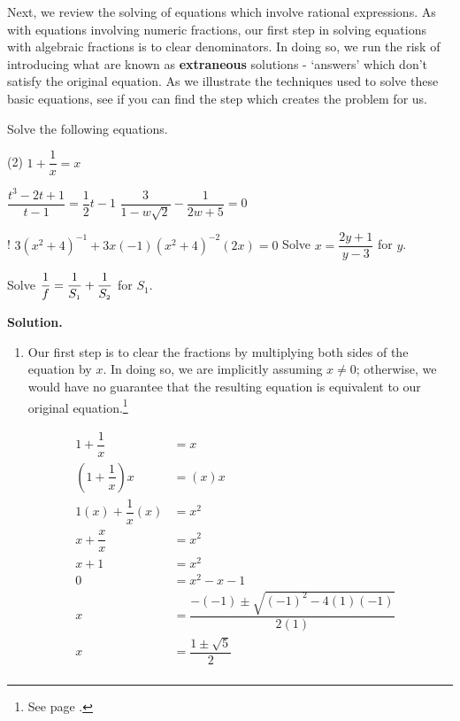 Next, we review the solving of equations which involve rational expressions.  As with equations involving numeric fractions, our first step in solving equations with algebraic fractions is to clear denominators.  In doing so, we run the risk of introducing what are known as \textbf{extraneous} solutions - `answers' which don't satisfy the original equation.  As we illustrate the techniques used to solve these basic equations, see if you can find the step which creates the problem for us.

\begin{ex}\label{rateqnreviewex} Solve the following equations.

\begin{tasks}(2)
\task  $1 + \dfrac{1}{x} = x$

\task  $\dfrac{t^3-2t+1}{t-1} = \dfrac{1}{2}t-1$
\task  $\dfrac{3}{1 - w\sqrt{2}} - \dfrac{1}{2w+5} = 0$

\task! $3(x^2+4)^{-1} + 3x(-1)(x^2+4)^{-2}(2x) = 0$
\task  Solve $x = \dfrac{2y+1}{y-3}$ for $y$. 

\task  Solve $\dfrac{1}{f} = \dfrac{1}{S_{\text{\tiny $1$}}} + \dfrac{1}{S_{\text{\tiny $2$}}}$ for $S_{1}$.

\end{tasks}

{\bf Solution.} 

\begin{enumerate}

\item   Our first step is to clear the fractions by multiplying both sides of the equation by $x$. In doing so, we are implicitly assuming $x \neq 0$; otherwise, we would have no guarantee that the resulting equation is equivalent to our original equation.\footnote{See page \pageref{box:equivalenteqnineq}.}

\begin{align*}
1 + \dfrac{1}{x} & = x & \\ 
\left(1 + \dfrac{1}{x}\right) x & = (x)x \tag{Provided $x \neq 0$} \\ 
1(x) + \dfrac{1}{x} (x) & = x^2 \tag{Distribute} \\ 
x + \dfrac{x}{x} & = x^2 \tag{Multiply} \\ 
x + 1 & = x^2 &  \\
0 & = x^2 - x - 1 \tag{Subtract $x$, subtract $1$} \\ 
x & = \dfrac{-(-1) \pm \sqrt{(-1)^2 - 4(1)(-1)}}{2(1)} \tag{Quadratic Formula} \\
x & = \dfrac{1 \pm \sqrt{5}}{2} \tag{Simplify} \\
\end{align*}


\end{enumerate}
\end{ex}
